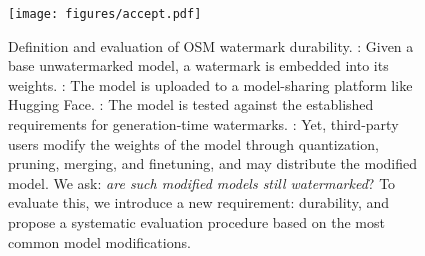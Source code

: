 \begin{figure}[t]
    \centering
    \texttt{[image: figures/accept.pdf]}
    \caption{Definition and evaluation of OSM watermark durability. 
    : Given a base unwatermarked model, a watermark is embedded into its weights. 
    : The model is uploaded to a model-sharing platform like Hugging Face.
    : The model is tested against the established requirements for generation-time watermarks. 
    : Yet, third-party users modify the weights of the model through quantization, pruning, merging, and finetuning, and may distribute the modified model. 
    We ask: \emph{are such modified models still watermarked}? 
    To evaluate this, we introduce a new requirement: {durability}, and propose a systematic evaluation procedure based on the most common model modifications.
    }
    \label{fig:accept}
    \vspace{-0.1in}
\end{figure}
